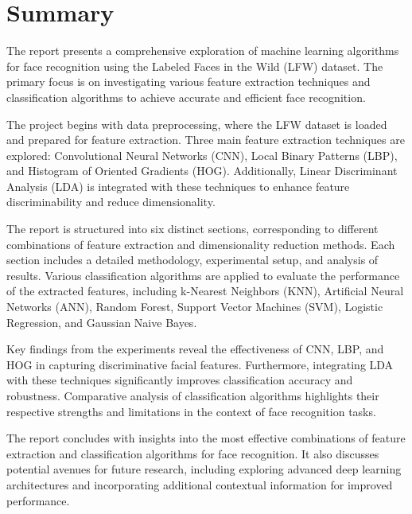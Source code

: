 \documentclass[a4paper]{article}
\theoremstyle{plain}
\theoremstyle{definition}
\begin{document}
	
	
	
	
	\section{Summary}
	\label{sec:app}
 \fontsize{15}{15}\selectfont
	The report presents a comprehensive exploration of machine learning algorithms for face recognition using the Labeled Faces in the Wild (LFW) dataset. The primary focus is on investigating various feature extraction techniques and classification algorithms to achieve accurate and efficient face recognition.\vspace{8pt}

The project begins with data preprocessing, where the LFW dataset is loaded and prepared for feature extraction. Three main feature extraction techniques are explored: Convolutional Neural Networks (CNN), Local Binary Patterns (LBP), and Histogram of Oriented Gradients (HOG). Additionally, Linear Discriminant Analysis (LDA) is integrated with these techniques to enhance feature discriminability and reduce dimensionality.\vspace{8pt}

The report is structured into six distinct sections, corresponding to different combinations of feature extraction and dimensionality reduction methods. Each section includes a detailed methodology, experimental setup, and analysis of results. Various classification algorithms are applied to evaluate the performance of the extracted features, including k-Nearest Neighbors (KNN), Artificial Neural Networks (ANN), Random Forest, Support Vector Machines (SVM), Logistic Regression, and Gaussian Naive Bayes.\vspace{8pt}

Key findings from the experiments reveal the effectiveness of CNN, LBP, and HOG in capturing discriminative facial features. Furthermore, integrating LDA with these techniques significantly improves classification accuracy and robustness. Comparative analysis of classification algorithms highlights their respective strengths and limitations in the context of face recognition tasks.\vspace{8pt}

The report concludes with insights into the most effective combinations of feature extraction and classification algorithms for face recognition. It also discusses potential avenues for future research, including exploring advanced deep learning architectures and incorporating additional contextual information for improved performance.\vspace{8pt}
\end{document}
